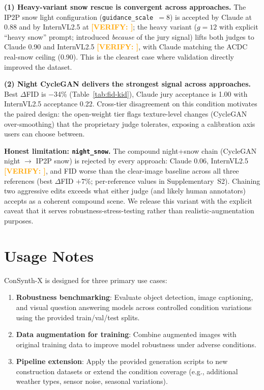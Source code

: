 \documentclass[12pt]{article}
\newcommand{\verify}[1]{\textcolor{orange}{\textbf{[VERIFY: #1]}}}
\begin{document}
\textbf{(1) Heavy-variant snow rescue is convergent across approaches.} The IP2P snow light configuration (\texttt{guidance\_scale}~$=8$) is accepted by Claude at 0.88 and by InternVL2.5 at \verify{}; the heavy variant ($g{=}12$ with explicit ``heavy snow'' prompt; introduced \emph{because} of the jury signal) lifts both judges to Claude 0.90 and InternVL2.5 \verify{}, with Claude matching the ACDC real-snow ceiling (0.90). This is the clearest case where validation directly improved the dataset.

\textbf{(2) Night CycleGAN delivers the strongest signal across approaches.} Best $\Delta$FID is $-$34\% (Table~\ref{tab:fid-kid}), Claude jury acceptance is 1.00 with InternVL2.5 acceptance 0.22. Cross-tier disagreement on this condition motivates the paired design: the open-weight tier flags texture-level changes (CycleGAN over-smoothing) that the proprietary judge tolerates, exposing a calibration axis users can choose between.

\textbf{Honest limitation: \texttt{night\_snow}.} The compound night+snow chain (CycleGAN night $\to$ IP2P snow) is rejected by every approach: Claude 0.06, InternVL2.5 \verify{}, and FID worse than the clear-image baseline across all three references (best $\Delta$FID $+$7\%; per-reference values in Supplementary~S2). Chaining two aggressive edits exceeds what either judge (and likely human annotators) accepts as a coherent compound scene. We release this variant with the explicit caveat that it serves robustness-stress-testing rather than realistic-augmentation purposes.


\section{Usage Notes}

ConSynth-X is designed for three primary use cases:

\begin{enumerate}[noitemsep]
    \item \textbf{Robustness benchmarking}: Evaluate object detection, image captioning, and visual question answering models across controlled condition variations using the provided train/val/test splits.
    \item \textbf{Data augmentation for training}: Combine augmented images with original training data to improve model robustness under adverse conditions.
    \item \textbf{Pipeline extension}: Apply the provided generation scripts to new construction datasets or extend the condition coverage (e.g., additional weather types, sensor noise, seasonal variations).
\end{enumerate}
\end{document}

